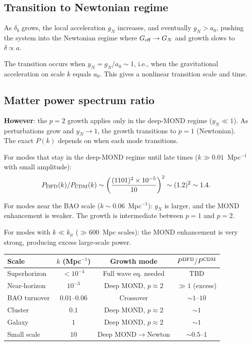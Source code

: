 \documentclass[11pt]{article}
\newcommand{\Geff}{G_{\rm eff}}
\begin{document}
\subsection{Transition to Newtonian regime}

As $\delta_b$ grows, the local acceleration $g_N$ increases, and
eventually $g_N > a_0$, pushing the system into the Newtonian regime
where $\Geff \to G_N$ and growth slows to $\delta \propto a$.

The transition occurs when $y_N = g_N/a_0 \sim 1$, i.e., when the
gravitational acceleration on scale $k$ equals $a_0$. This gives a
nonlinear transition scale and time.

\subsection{Matter power spectrum ratio}

\textbf{However}: the $p = 2$ growth applies only in the deep-MOND
regime ($y_N \ll 1$). As perturbations grow and $y_N \to 1$, the
growth transitions to $p = 1$ (Newtonian). The exact $P(k)$ depends
on when each mode transitions.

For modes that stay in the deep-MOND regime until late times
($k \gg 0.01$~Mpc$^{-1}$ with small amplitude):
\begin{equation}
P_{\rm DFD}(k) / P_{\rm CDM}(k) \sim \left(\frac{(1101)^2\times 10^{-5}}{10}\right)^2
\sim (1.2)^2 \sim 1.4.
\end{equation}

For modes near the BAO scale ($k \sim 0.06$~Mpc$^{-1}$):
$y_N$ is larger, and the MOND enhancement is weaker. The growth is
intermediate between $p = 1$ and $p = 2$.

For modes with $k \ll k_\mu$ ($\gg 600$~Mpc scales):
the MOND enhancement is very strong, producing excess large-scale power.

\begin{center}
\begin{tabular}{lccc}
\toprule
Scale & $k$ (Mpc$^{-1}$) & Growth mode & $P^{\rm DFD}/P^{\rm CDM}$ \\
\midrule
Superhorizon & $<10^{-4}$ & Full wave eq. needed & TBD \\
Near-horizon & $10^{-3}$ & Deep MOND, $p\approx 2$ & $\gg 1$ (excess) \\
BAO turnover & $0.01$--$0.06$ & Crossover & $\sim 1$--$10$ \\
Cluster & $0.1$ & Deep MOND, $p\approx 2$ & $\sim 1$ \\
Galaxy & $1$ & Deep MOND, $p\approx 2$ & $\sim 1$ \\
Small scale & $10$ & Deep MOND$\to$Newton & $\sim 0.5$--$1$ \\
\bottomrule
\end{tabular}
\end{center}
\end{document}
